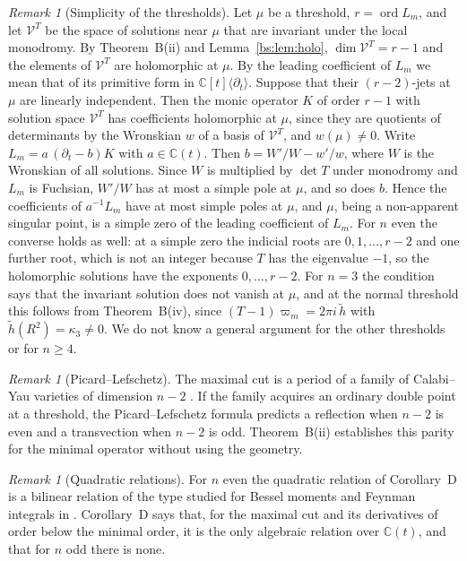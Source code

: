 \documentclass[11pt,a4paper]{article}
\theoremstyle{definition}
\theoremstyle{remark}
\newtheorem{remark}[theorem]{Remark}
\numberwithin{equation}{section}
\newcommand{\C}{\mathbb{C}}
\DeclareMathOperator{\ord}{ord}
\begin{document}
\begin{remark}[Simplicity of the thresholds]\label{bs:rem:simple}
Let $\mu$ be a threshold, $r=\ord L_m$, and let $\mathcal V^T$ be the space of solutions near $\mu$ that are invariant under the local monodromy. By Theorem~B(ii) and Lemma~\ref{bs:lem:holo}, $\dim\mathcal V^T=r-1$ and the elements of $\mathcal V^T$ are holomorphic at $\mu$. By the leading coefficient of $L_m$ we mean that of its primitive form in $\C[t]\langle\partial_t\rangle$. Suppose that their $(r-2)$-jets at $\mu$ are linearly independent. Then the monic operator $K$ of order $r-1$ with solution space $\mathcal V^T$ has coefficients holomorphic at $\mu$, since they are quotients of determinants by the Wronskian $w$ of a basis of $\mathcal V^T$, and $w(\mu)\ne0$. Write $L_m=a\,(\partial_t-b)K$ with $a\in\C(t)$. Then $b=W'/W-w'/w$, where $W$ is the Wronskian of all solutions. Since $W$ is multiplied by $\det T$ under monodromy and $L_m$ is Fuchsian, $W'/W$ has at most a simple pole at $\mu$, and so does $b$. Hence the coefficients of $a^{-1}L_m$ have at most simple poles at $\mu$, and $\mu$, being a non-apparent singular point, is a simple zero of the leading coefficient of $L_m$. For $n$ even the converse holds as well: at a simple zero the indicial roots are $0,1,\dots,r-2$ and one further root, which is not an integer because $T$ has the eigenvalue $-1$, so the holomorphic solutions have the exponents $0,\dots,r-2$. For $n=3$ the condition says that the invariant solution does not vanish at $\mu$, and at the normal threshold this follows from Theorem~B(iv), since $(T-1)\varpi_m=2\pi i\,\tilde h$ with $\tilde h(R^2)=\kappa_3\ne0$. We do not know a general argument for the other thresholds or for $n\ge4$.
\end{remark}

\begin{remark}[Picard--Lefschetz]
The maximal cut is a period of a family of Calabi--Yau varieties of dimension $n-2$ \cite{BKV15,BFKNS21,LV23}. If the family acquires an ordinary double point at a threshold, the Picard--Lefschetz formula predicts a reflection when $n-2$ is even and a transvection when $n-2$ is odd. Theorem~B(ii) establishes this parity for the minimal operator without using the geometry.
\end{remark}

\begin{remark}[Quadratic relations]
For $n$ even the quadratic relation of Corollary~D is a bilinear relation of the type studied for Bessel moments and Feynman integrals in \cite{FSY20,DPSS24}. Corollary~D says that, for the maximal cut and its derivatives of order below the minimal order, it is the only algebraic relation over $\C(t)$, and that for $n$ odd there is none.
\end{remark}
\end{document}
